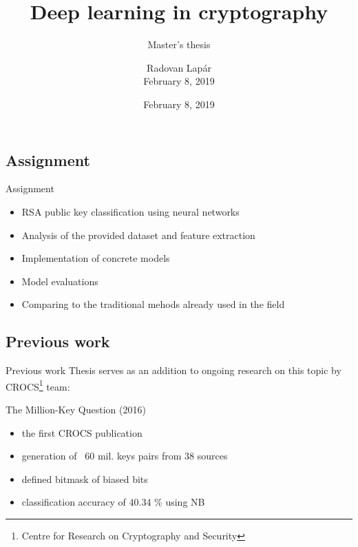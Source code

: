 \documentclass{beamer}
\title[Deep learning in cryptography]{Deep learning in cryptography}
\subtitle{Master's thesis}
\author[R.\,Lap\'{a}r]{Radovan Lap\'{a}r \\ February 8, 2019}
\institute[FI MU]{Faculty of Informatics, Masaryk University}
\date{February 8, 2019}
\newcommand\Fontsmall{\fontsize{8}{7.2}\selectfont}
\let\oldfootnote\footnote
\renewcommand\footnote[1][]{\oldfootnote[frame,#1]}
\begin{document}
  \frame{\maketitle}


  \begin{darkframes}
    \section{Assignment}

    \begin{frame}{Assignment}
      \begin{itemize}
        \item RSA public key classification using neural networks
        \vspace{3mm}
        \item Analysis of the provided dataset and feature extraction
        \vspace{3mm}
        \item Implementation of concrete models
        \vspace{3mm}
        \item Model evaluations
        \vspace{3mm}
        \item Comparing to the traditional mehods already used in the field
      \end{itemize}
    \end{frame}

    \subsection{Previous work}

    \begin{frame}{Previous work}   
    \Fontsmall   
    Thesis serves as an addition to ongoing research on this topic by CROCS\footnote{Centre for Research on Cryptography and Security} team:
    \begin{exampleblock}{The Million-Key Question (2016)}
      \begin{itemize}
        \item the first CROCS publication
        \item generation of ~60 mil. keys pairs from 38 sources
        \item defined bitmask of biased bits
        \item classification accuracy of 40.34 \% using NB
      \end{itemize}
    \end{exampleblock}
    

\end{frame}
\end{darkframes}
\end{document}
